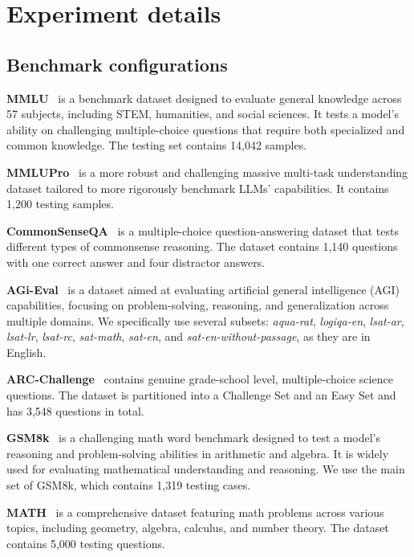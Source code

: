 \section{Experiment details}



\subsection{Benchmark configurations} \label{appendix:benchmark}


\textbf{MMLU}~\citep{mmlu1, mmlu2} is a benchmark dataset designed to evaluate general knowledge across 57 subjects, including STEM, humanities, and social sciences. It tests a model's ability on challenging multiple-choice questions that require both specialized and common knowledge. The testing set contains 14,042 samples.

\noindent\textbf{MMLUPro}~\citep{mmlupro} is a more robust and challenging massive multi-task understanding dataset tailored to more rigorously benchmark LLMs' capabilities. It contains 1,200 testing samples.

\noindent\textbf{CommonSenseQA}~\citep{csqa} is a multiple-choice question-answering dataset that tests different types of commonsense reasoning.  The dataset contains 1,140 questions with one correct answer and four distractor answers.

\noindent\textbf{AGi-Eval}~\citep{agieval} is a dataset aimed at evaluating artificial general intelligence (AGI) capabilities, focusing on problem-solving, reasoning, and generalization across multiple domains. We specifically use several subsets: \textit{aqua-rat}, \textit{logiqa-en}, \textit{lsat-ar}, \textit{lsat-lr}, \textit{lsat-rc}, \textit{sat-math}, \textit{sat-en}, and \textit{sat-en-without-passage}, as they are in English.

\noindent\textbf{ARC-Challenge}~\citep{arc} contains genuine grade-school level, multiple-choice science questions. The dataset is partitioned into a Challenge Set and an Easy Set and has 3,548 questions in total.

\noindent\textbf{GSM8k}~\citep{gsm8k} is a challenging math word benchmark designed to test a model's reasoning and problem-solving abilities in arithmetic and algebra. It is widely used for evaluating mathematical understanding and reasoning. We use the main set of GSM8k, which contains 1,319 testing cases.

\noindent\textbf{MATH}~\citep{math} is a comprehensive dataset featuring math problems across various topics, including geometry, algebra, calculus, and number theory. The dataset contains 5,000 testing questions.

